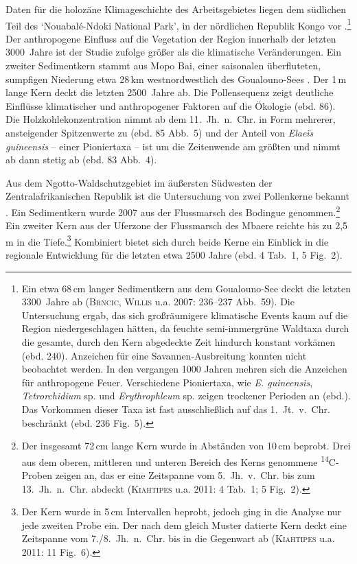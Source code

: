 Daten für die holozäne Klimageschichte des Arbeitsgebietes liegen dem südlichen Teil des \enquote*{Nouabalé-Ndoki National Park}, in der nördlichen Republik Kongo vor \parencite{Brncic.2007}.\footnote{Ein etwa 68\,cm langer Sedimentkern aus dem Goualouno-See deckt die letzten 3300~Jahre ab (\textsc{Brncic, Willis} u.a. 2007: 236--237 Abb.~59). Die Untersuchung ergab, das sich großräumigere klimatische Events kaum auf die Region niedergeschlagen hätten, da feuchte semi-immergrüne Waldtaxa durch die gesamte, durch den Kern abgedeckte Zeit hindurch konstant vorkämen (ebd. 240). Anzeichen für eine Savannen-Ausbreitung konnten nicht beobachtet werden. In den vergangen 1000 Jahren mehren sich die Anzeichen für anthropogene Feuer. Verschiedene Pioniertaxa, wie \textit{E. guineensis}, \textit{Tetrorchidium} sp. und \textit{Erythrophleum} sp. zeigen trockener Perioden an (ebd.). Das Vorkommen dieser Taxa ist fast ausschließlich auf das 1.~Jt.~v.~Chr. beschränkt (ebd. 236 Fig.~5).} Der anthropogene Einfluss auf die Vegetation der Region innerhalb der letzten 3000~Jahre ist der Studie zufolge größer als die klimatische Veränderungen. Ein zweiter Sedimentkern stammt aus Mopo Bai, einer saisonalen überfluteten, sumpfigen Niederung etwa 28\,km westnordwestlich des Goualouno-Sees \parencite[80]{Brncic.2009}. Der 1\,m lange Kern deckt die letzten 2500~Jahre ab. Die Pollensequenz zeigt deutliche Einflüsse klimatischer und anthropogener Faktoren auf die Ökologie (ebd. 86). Die Holzkohlekonzentration nimmt ab dem 11.~Jh.~n.~Chr. in Form mehrerer, ansteigender Spitzenwerte zu (ebd. 85 Abb.~5) und der Anteil von \textit{Elaeïs guineensis} -- einer Pioniertaxa -- ist um die Zeitenwende am größten und nimmt ab dann stetig ab (ebd. 83 Abb.~4).

Aus dem Ngotto-Waldschutzgebiet im äußersten Südwesten der Zentralafrikanischen Republik ist die Untersuchung von zwei Pollenkerne bekannt \parencite{Kiahtipes.2011}. Ein Sedimentkern wurde 2007 aus der Flussmarsch des Bodingue genommen.\footnote{Der insgesamt 72\,cm lange Kern wurde in Abständen von 10\,cm beprobt. Drei aus dem oberen, mittleren und unteren Bereich des Kerns genommene \textsuperscript{14}C-Proben zeigen an, das er eine Zeitspanne vom 5.~Jh.~v.~Chr. bis zum 13.~Jh.~n.~Chr. abdeckt (\textsc{Kiahtipes} u.a. 2011: 4 Tab.~1; 5 Fig.~2).} Ein zweiter Kern aus der Uferzone der Flussmarsch des Mbaere reichte bis zu 2,5\,m in die Tiefe.\footnote{Der Kern wurde in 5\,cm Intervallen beprobt, jedoch ging in die Analyse nur jede zweiten Probe ein. Der nach dem gleich Muster datierte Kern deckt eine Zeitspanne vom 7./8.~Jh.~n.~Chr. bis in die Gegenwart ab (\textsc{Kiahtipes} u.a. 2011: 11 Fig.~6).} Kombiniert bietet sich durch beide Kerne ein Einblick in die regionale Entwicklung für die letzten etwa 2500 Jahre (ebd. 4 Tab.~1, 5 Fig.~2).

